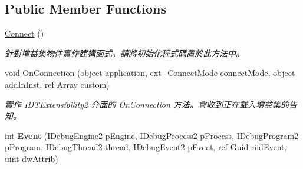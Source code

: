 \subsection*{Public Member Functions}
\begin{DoxyCompactItemize}
\item 
\hyperlink{class_thread_watcher_1_1_connect_a1f2395c8f36b6f8c29bb0e1ee27d55ec}{Connect} ()
\begin{DoxyCompactList}\small\item\em 針對增益集物件實作建構函式。請將初始化程式碼置於此方法中。\end{DoxyCompactList}\item 
void \hyperlink{class_thread_watcher_1_1_connect_a0dbdd7934d44f9b32ffb7e9cdf71f05a}{On\+Connection} (object application, ext\+\_\+\+Connect\+Mode connect\+Mode, object add\+In\+Inst, ref Array custom)
\begin{DoxyCompactList}\small\item\em 實作 I\+D\+T\+Extensibility2 介面的 On\+Connection 方法。會收到正在載入增益集的告知。\end{DoxyCompactList}\item 
\hypertarget{class_thread_watcher_1_1_connect_aa5d1d9da7afa9ea4ecb9c98de7e55514}{int {\bfseries Event} (I\+Debug\+Engine2 p\+Engine, I\+Debug\+Process2 p\+Process, I\+Debug\+Program2 p\+Program, I\+Debug\+Thread2 thread, I\+Debug\+Event2 p\+Event, ref Guid riid\+Event, uint dw\+Attrib)}\label{class_thread_watcher_1_1_connect_aa5d1d9da7afa9ea4ecb9c98de7e55514}


\end{DoxyCompactItemize}
